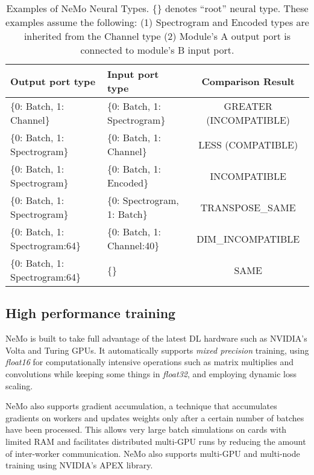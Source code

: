 \documentclass{article}
\begin{document}
\begin{table}[!ht]
\centering
\label{tab:types}
\begin{tabular} {l|l|c} 
 \toprule
           Output port type & Input port type & Comparison Result  \\
 \hline 
         \{0: Batch, 1: Channel\} & \{0: Batch, 1: Spectrogram\} & GREATER (INCOMPATIBLE) \\
\{0: Batch, 1: Spectrogram\} & \{0: Batch, 1: Channel\}  & LESS (COMPATIBLE) \\
         \{0: Batch, 1: Spectrogram\} & \{0: Batch, 1: Encoded\}  & INCOMPATIBLE \\
         \{0: Batch, 1: Spectrogram\} & \{0: Spectrogram, 1: Batch\}  & TRANSPOSE\_SAME \\
        \{0: Batch, 1: Spectrogram:64\} & \{0: Batch, 1: Channel:40\}  & DIM\_INCOMPATIBLE \\
        \{0: Batch, 1: Spectrogram:64\} & \{\}  & SAME \\
         
\bottomrule
\end{tabular}
\caption{Examples of NeMo Neural Types. \{\} denotes ``root'' neural type. These examples assume the following: (1) Spectrogram and Encoded types are inherited from the Channel type (2) Module's A output port is connected to module's B input port.}
\end{table}

\subsection{High performance training}
NeMo is built to take full advantage of the latest DL hardware such as NVIDIA's Volta and Turing GPUs. It automatically supports \textit{mixed precision} training, using \textit{float16} for computationally intensive operations such as matrix multiplies and convolutions while keeping some things in \textit{float32}, and employing dynamic loss scaling\citep{micikevicius2017}.

NeMo also supports gradient accumulation, a technique that accumulates gradients on workers and updates weights only after a certain number of batches have been processed. This allows very large batch simulations on cards with limited RAM and facilitates distributed multi-GPU runs by reducing the amount of inter-worker communication. NeMo also supports multi-GPU and multi-node training using NVIDIA's APEX library\citep{apex}. 
\end{document}
